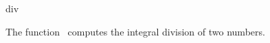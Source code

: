 \begin{ccRefFunction}{div}

\ccDefinition

The function \ccRefName\ computes the integral division of two numbers.


{}


\end{ccRefFunction}
